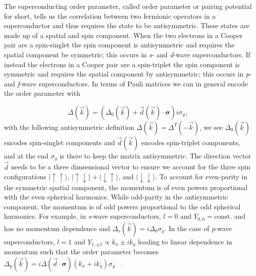 The superconducting order parameter, called order parameter or pairing potential for short, tells us the correlation between two fermionic operators in a superconductor and thus requires the state to be antisymmetric.
These states are made up of a spatial and spin component.
When the two electrons in a Cooper pair are a spin-singlet the spin component is antisymmetric and requires the spatial component be symmetric; this occurs in \textit{s}- and \textit{d}-wave superconductors.
If instead the electrons in a Cooper pair are a spin-triplet the spin component is symmetric and requires the spatial component by antisymmetric; this occurs in \textit{p}- and \textit{f}-wave superconductors.
In terms of Pauli matrices we can in general encode the order parameter with

\begin{equation}
  \Delta (\vec{k}) = \left(\Delta_0 (\vec{k}) + \vec{d}(\vec{k}) \cdot \bm{\sigma}\right) i \sigma_y,
\end{equation}
with the following antisymmetric definition $\Delta(\vec{k}) = \Delta^T(-\vec{k})$, we see $\Delta_0 (\vec{k})$ encodes spin-singlet components and $\vec{d}(\vec{k})$ encodes spin-triplet components, and at the end $\sigma_y$ is there to keep the matrix antisymmetric.
The direction vector $\vec{d}$ needs to be a three dimsensional vector to ensure we account for the three spin configurations
$|\uparrow\uparrow\rangle$, $|\uparrow\downarrow\rangle + |\downarrow\uparrow\rangle$, and $|\downarrow\downarrow\rangle$.
To account for even-parity in the symmetric spatial component, the momentum is of even powers proportional with the even spherical harmonics.
While odd-parity in the antisymmetric component, the momentum is of odd powers proportional to the odd spherical harmonics.
For example, in \textit{s}-wave superconductors, $l=0$ and $Y_{0,0} = \text{const.}$ and has no momentum dependence and
$\Delta_s (\vec{k}) = i\Delta_0 \sigma_y$.
In the case of \textit{p}-wave superconductors, $l=1$ and $Y_{1,\pm1} \propto k_x \pm i k_y$ leading to linear dependence in momentum such that the order parameter becomes
$\Delta_p(\vec{k}) = i\Delta (\vec{d} \cdot \bm{\sigma}) (k_x+ik_y) \sigma_y$ ~\cite{ivanovNonAbelianStatisticsHalfQuantum2001}.

